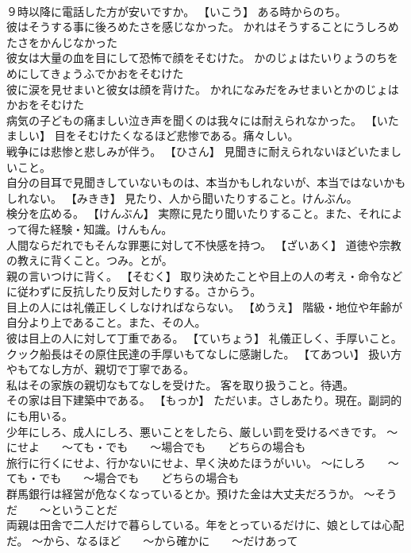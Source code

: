 \documentclass[8pt]{extreport}
\begin{document}
\begin{CJK}{UTF8}{min}
\\	９時以降に電話した方が安いですか。	【いこう】 ある時からのち。
\\	彼はそうする事に後ろめたさを感じなかった。	かれはそうすることにうしろめたさをかんじなかった 
\\	彼女は大量の血を目にして恐怖で顔をそむけた。	かのじょはたいりょうのちをめにしてきょうふでかおをそむけた 
\\	彼に涙を見せまいと彼女は顔を背けた。	かれになみだをみせまいとかのじょはかおをそむけた 
\\	病気の子どもの痛ましい泣き声を聞くのは我々には耐えられなかった。	【いたましい】 目をそむけたくなるほど悲惨である。痛々しい。
\\	戦争には悲惨と悲しみが伴う。	【ひさん】 見聞きに耐えられないほどいたましいこと。
\\	自分の目耳で見聞きしていないものは、本当かもしれないが、本当ではないかもしれない。	【みきき】 見たり、人から聞いたりすること。けんぶん。
\\	検分を広める。	【けんぶん】 実際に見たり聞いたりすること。また、それによって得た経験・知識。けんもん。
\\	人間ならだれでもそんな罪悪に対して不快感を持つ。	【ざいあく】 道徳や宗教の教えに背くこと。つみ。とが。
\\	親の言いつけに背く。	【そむく】 取り決めたことや目上の人の考え・命令などに従わずに反抗したり反対したりする。さからう。
\\	目上の人には礼儀正しくしなければならない。	【めうえ】 階級・地位や年齢が自分より上であること。また、その人。
\\	彼は目上の人に対して丁重である。	【ていちょう】 礼儀正しく、手厚いこと。
\\	クック船長はその原住民達の手厚いもてなしに感謝した。	【てあつい】 扱い方やもてなし方が、親切で丁寧である。
\\	私はその家族の親切なもてなしを受けた。	客を取り扱うこと。待遇。
\\	その家は目下建築中である。	【もっか】 ただいま。さしあたり。現在。副詞的にも用いる。
\\	少年にしろ、成人にしろ、悪いことをしたら、厳しい罰を受けるべきです。	～にせよ　　～ても・でも　　～場合でも　　どちらの場合も
\\	旅行に行くにせよ、行かないにせよ、早く決めたほうがいい。	～にしろ　　～ても・でも　　～場合でも　　どちらの場合も
\\	群馬銀行は経営が危なくなっているとか。預けた金は大丈夫だろうか。	～そうだ　　～ということだ
\\	両親は田舎で二人だけで暮らしている。年をとっているだけに、娘としては心配だ。	～から、なるほど　　～から確かに　　～だけあって

\end{CJK}
\end{document}
